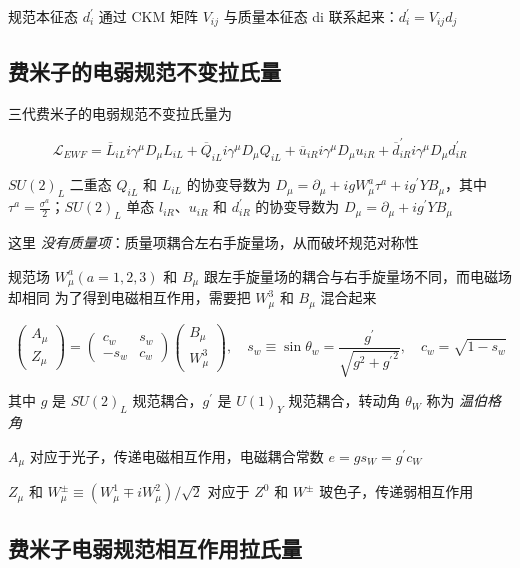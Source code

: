 规范本征态 $d_i^\prime$ 通过 CKM 矩阵 $V_{ij}$ 与质量本征态 di 联系起来：$d_i^\prime=V_{ij} d_j$

\subsection{费米子的电弱规范不变拉氏量}

三代费米子的电弱规范不变拉氏量为

\begin{equation}
    \mathcal{L}_{EWF} = \overline{L}_{iL} i \gamma^\mu D_\mu L_{iL} + \overline{Q}_{iL} i \gamma^\mu D_\mu Q_{iL} + \overline{u}_{iR} i \gamma^\mu D_\mu u_{iR} + \overline{d}_{iR}^\prime i \gamma^\mu D_\mu d_{iR}^\prime
\end{equation}

$SU(2)_L$ 二重态 $Q_{iL}$ 和 $L_{iL}$ 的协变导数为 $D_\mu=\partial_\mu+ig W_\mu^a \tau^a+ig^\prime Y B_\mu$，其中 $\tau^a=\frac{\sigma^a}{2}$；$SU(2)_L$ 单态 $l_{iR}$、$u_{iR}$ 和 $d_{iR}^\prime$ 的协变导数为 $D_\mu=\partial_\mu+i g^\prime Y B_\mu$

这里 \emph{没有质量项}：质量项耦合左右手旋量场，从而破坏规范对称性

规范场 $W_\mu^a (a=1,2,3)$ 和 $B_\mu$ 跟左手旋量场的耦合与右手旋量场不同，而电磁场却相同 为了得到电磁相互作用，需要把 $W_\mu^3$ 和 $B_\mu$ 混合起来

\begin{equation}
    \begin{pmatrix}A_\mu \\ Z_\mu\end{pmatrix} = \begin{pmatrix}c_w & s_w \\ -s_w & c_w \end{pmatrix} \begin{pmatrix}B_\mu \\ W_\mu^3\end{pmatrix}, \quad s_w \equiv \sin \theta_w = \frac{g^\prime}{\sqrt{g^2+{g^\prime}^2}}, \quad c_w = \sqrt{1 - s_w}
\end{equation}

其中 $g$ 是 $SU(2)_L$ 规范耦合，$g^\prime$ 是 $U(1)_Y$ 规范耦合，转动角 $\theta_W$ 称为 \emph{温伯格角}

$A_\mu$ 对应于光子，传递电磁相互作用，电磁耦合常数 $e=g s_W=g^\prime c_W$

$Z_\mu$ 和 $W_\mu^\pm \equiv (W_\mu^1 \mp i W_\mu^2)/ \sqrt{2}$ 对应于 $Z^0$ 和 $W^\pm$ 玻色子，传递弱相互作用

\subsection{费米子电弱规范相互作用拉氏量}

